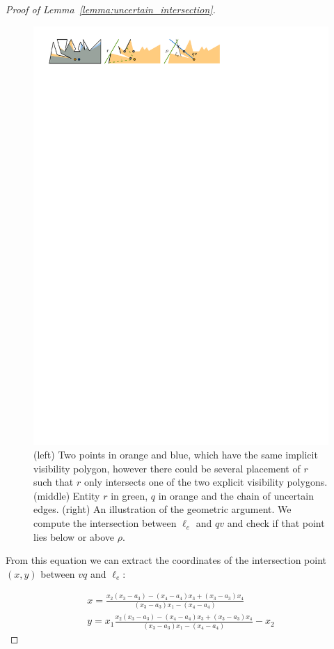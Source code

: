 \documentclass[a4paper, UKenglish]{lipics-v2018}
\begin{document}
\begin{proof}[Proof of Lemma~\ref{lemma:uncertain_intersection}]
\begin{figure}[h]
    \centering
    \includegraphics[]{../pointline}
    \caption{ (left) Two points in orange and blue, which have the same implicit visibility polygon, however there could be several placement of $r$ such that $r$ only intersects one of the two explicit visibility polygons. (middle) Entity $r$ in green, $q$ in orange and the chain of uncertain edges. (right) An illustration of the geometric argument. We compute the intersection between $\ell_e$ and $qv$ and check if that point lies below or above $\rho$.}
    \label{fig:pointline}
\end{figure}


From this equation we can extract the coordinates of the intersection point $(x,y)$ between $vq$ and $\ell_e$:

\begin{align*}
    x = \frac{x_2 (x_3 - a_3) - (x_4 - a_4)x_3 + (x_3 - a_3) x_4}{ (x_3 - a_3)x_1 - (x_4 - a_4)} \\
    y = x_1 \frac{x_2 (x_3 - a_3) - (x_4 - a_4)x_3 + (x_3 - a_3) x_4}{ (x_3 - a_3)x_1 - (x_4 - a_4)} - x_2
\end{align*}


\end{proof}
\end{document}
